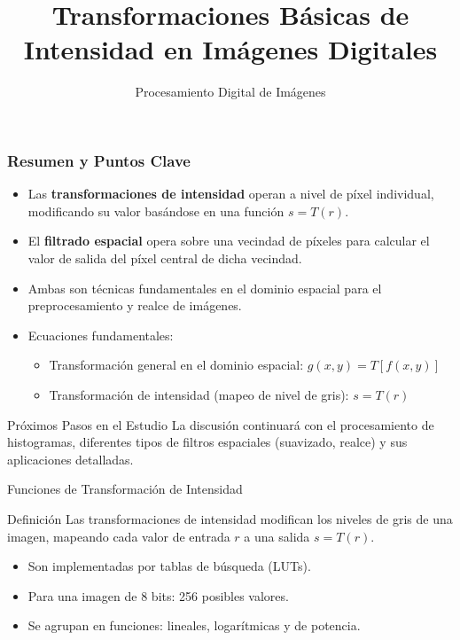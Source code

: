 \documentclass{beamer}
\begin{document}
\begin{frame}
    \frametitle{Resumen y Puntos Clave}
    \begin{itemize}
        \item Las \textbf{transformaciones de intensidad} operan a nivel de píxel individual, modificando su valor basándose en una función $s=T(r)$.
        \item El \textbf{filtrado espacial} opera sobre una vecindad de píxeles para calcular el valor de salida del píxel central de dicha vecindad.
        \item Ambas son técnicas fundamentales en el dominio espacial para el preprocesamiento y realce de imágenes.
        \item Ecuaciones fundamentales:
        \begin{itemize}
            \item Transformación general en el dominio espacial: \(g(x, y) = T[f(x, y)]\)
            \item Transformación de intensidad (mapeo de nivel de gris): \(s = T(r)\)
        \end{itemize}
    \end{itemize}
    \begin{block}{Próximos Pasos en el Estudio}
        La discusión continuará con el procesamiento de histogramas, diferentes tipos de filtros espaciales (suavizado, realce) y sus aplicaciones detalladas.
    \end{block}
\end{frame}



\title{Transformaciones Básicas de Intensidad en Imágenes Digitales}
\author{Procesamiento Digital de Imágenes}
\date{}

\begin{frame}
  \titlepage
\end{frame}

\begin{frame}{Funciones de Transformación de Intensidad}
\begin{block}{Definición}
Las transformaciones de intensidad modifican los niveles de gris de una imagen, mapeando cada valor de entrada \( r \) a una salida \( s = T(r) \).
\end{block}
\vspace{1em}
\begin{itemize}
    \item Son implementadas por tablas de búsqueda (LUTs).
    \item Para una imagen de 8 bits: 256 posibles valores.
    \item Se agrupan en funciones: lineales, logarítmicas y de potencia.
\end{itemize}
\end{frame}
\end{document}
